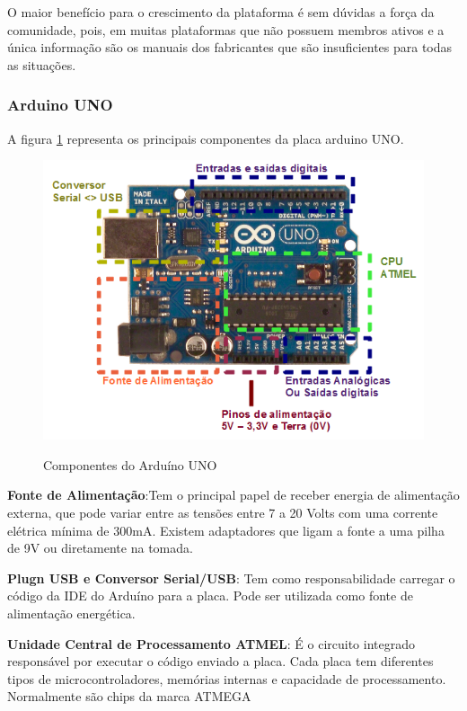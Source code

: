 O maior benefício para o crescimento da plataforma é sem dúvidas a força da comunidade, pois, em muitas plataformas que não possuem membros ativos e a única informação são os manuais dos fabricantes que são insuficientes para todas as situações. 

\subsubsection{Arduino UNO}
    
A figura \ref{fig:arduino} representa os principais componentes da placa arduino UNO.

\begin{figure}[!ht]
    \centering
    \caption{Componentes do Arduíno UNO}
    \includegraphics[scale = 0.75]{Figuras/Fig1_arduino.png}
    \label{fig:arduino}
\end{figure}

\textbf{Fonte de Alimentação}:Tem o principal papel de receber energia de alimentação externa, que pode variar entre as tensões entre 7 a 20 Volts com uma corrente elétrica mínima de 300mA. Existem adaptadores que ligam a fonte a uma pilha de 9V ou diretamente na tomada.

\textbf{Plugn USB e Conversor Serial/USB}: Tem como responsabilidade carregar o código da IDE do Arduíno para a placa. Pode ser utilizada como fonte de alimentação energética.

\textbf{Unidade Central de Processamento ATMEL}: É o circuito integrado responsável por executar o código enviado a placa. Cada placa tem  diferentes tipos de microcontroladores, memórias internas e capacidade de processamento. Normalmente são chips da marca ATMEGA

